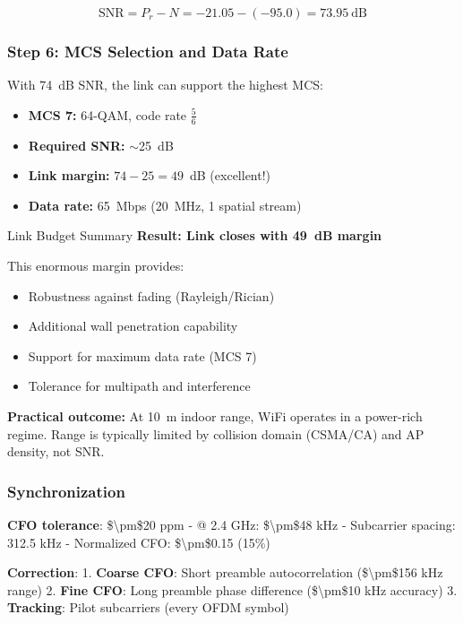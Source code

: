 \begin{equation}
\text{SNR} = P_r - N = -21.05 - (-95.0) = 73.95~\text{dB}
\end{equation}

\subsubsection*{Step 6: MCS Selection and Data Rate}

With 74~dB SNR, the link can support the highest MCS:
\begin{itemize}
\item \textbf{MCS 7:} 64-QAM, code rate $\frac{5}{6}$
\item \textbf{Required SNR:} $\sim$25~dB
\item \textbf{Link margin:} $74 - 25 = 49$~dB (excellent!)
\item \textbf{Data rate:} 65~Mbps (20~MHz, 1 spatial stream)
\end{itemize}

\begin{calloutbox}{Link Budget Summary}
\textbf{Result: Link closes with 49~dB margin}

This enormous margin provides:
\begin{itemize}
\item Robustness against fading (Rayleigh/Rician)
\item Additional wall penetration capability
\item Support for maximum data rate (MCS 7)
\item Tolerance for multipath and interference
\end{itemize}

\textbf{Practical outcome:} At 10~m indoor range, WiFi operates in a power-rich regime. Range is typically limited by collision domain (CSMA/CA) and AP density, not SNR.
\end{calloutbox}

\subsubsection{Synchronization}\label{synchronization}

\textbf{CFO tolerance}: \$\textbackslash pm\$20 ppm - @ 2.4 GHz:
\$\textbackslash pm\$48 kHz - Subcarrier spacing: 312.5 kHz - Normalized
CFO: \$\textbackslash pm\$0.15 (15\%)

\textbf{Correction}: 1. \textbf{Coarse CFO}: Short preamble
autocorrelation (\$\textbackslash pm\$156 kHz range) 2. \textbf{Fine
CFO}: Long preamble phase difference (\$\textbackslash pm\$10 kHz
accuracy) 3. \textbf{Tracking}: Pilot subcarriers (every OFDM symbol)

